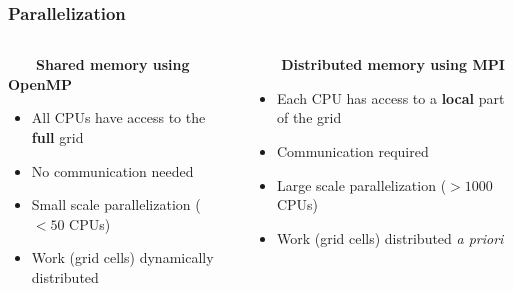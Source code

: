 \begin{frame}
    \frametitle{Parallelization}
    \tiny
    \begin{columns}
    \begin{column}{.5\textwidth}
	\ \ \ \ \textbf{Shared memory using OpenMP}
	\begin{itemize}
	    \item All CPUs have access to the \textbf{full} grid
	    \item No communication needed
	    \item Small scale parallelization ($<50$ CPUs)
	    \item Work (grid cells) dynamically distributed
	\end{itemize}
    \end{column}
    \begin{column}{.5\textwidth}
	\ \ \ \ \textbf{Distributed memory using MPI}
	\begin{itemize}
	    \item Each CPU has access to a \textbf{local} part of the grid
	    \item Communication required
	    \item Large scale parallelization ($>1000$ CPUs)
	    \item Work (grid cells) distributed \it{a priori}
	\end{itemize}
    \end{column}
    \end{columns}

    \vspace{10mm}


\end{frame}
